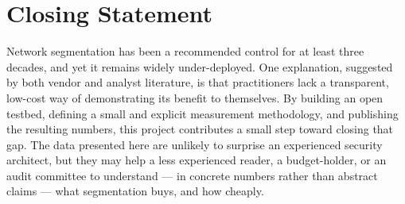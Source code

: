 \section{Closing Statement}

Network segmentation has been a recommended control for at least three decades, and yet it remains widely under-deployed. One explanation, suggested by both vendor and analyst literature, is that practitioners lack a transparent, low-cost way of demonstrating its benefit to themselves. By building an open testbed, defining a small and explicit measurement methodology, and publishing the resulting numbers, this project contributes a small step toward closing that gap. The data presented here are unlikely to surprise an experienced security architect, but they may help a less experienced reader, a budget-holder, or an audit committee to understand --- in concrete numbers rather than abstract claims --- what segmentation buys, and how cheaply.
